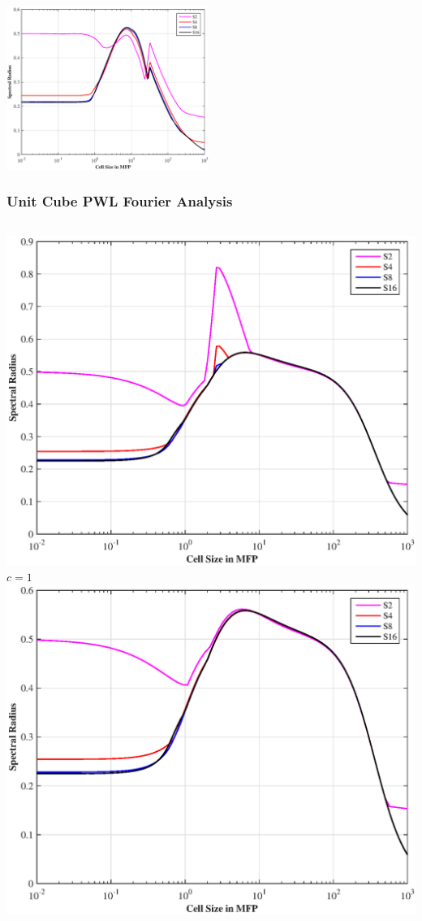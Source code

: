 \documentclass[compress,10pt]{beamer}
\begin{document}
\begin{frame}[t]
{\includegraphics[width=0.495\textwidth]{images/SI_MIP_quad_C=4_UMAXENT2_LS.eps}
}
\end{frame}
\begin{frame}[t]
{
\frametitle{Unit Cube PWL Fourier Analysis}
\vspace{1cm}
\begin{columns}
\centering
\includegraphics[width=\textwidth]{images/SI_MIP_hex_C=1_PWLD_LS.eps}\\
$c=1$
\centering
\includegraphics[width=\textwidth]{images/SI_MIP_hex_C=4_PWLD_LS.eps}\\

\end{columns}}
\end{frame}
\end{document}
